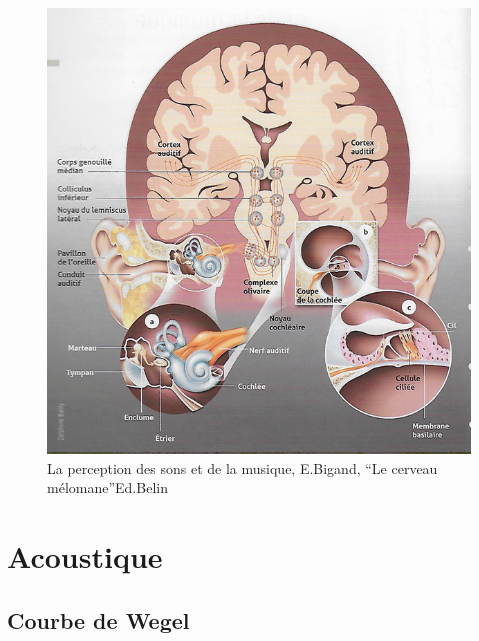         \begin{figure}
	\centering
	\includegraphics[width=1\linewidth]{images/schemacerveauoreillebigand.png}
	\caption[Schéma du déroulement]{La perception des sons et de
          la musique, E.Bigand, ``Le cerveau mélomane''Ed.Belin}
       
	\label{cerveauoreillebigand1}
\end{figure}




\chapter{Acoustique}

\section{Courbe de Wegel}
\label{acoustique}

